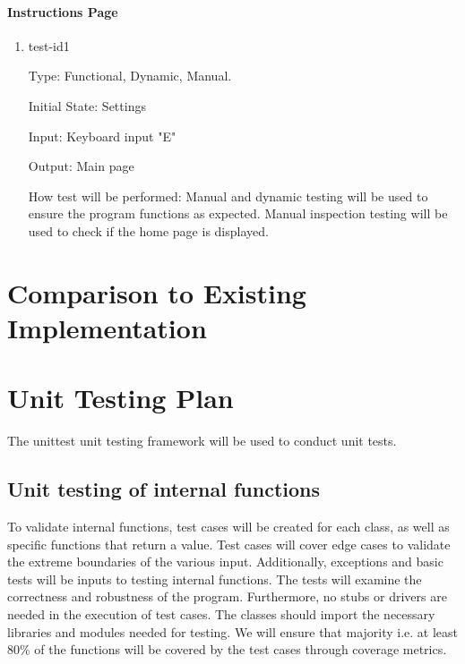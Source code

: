 \documentclass[12pt, titlepage]{article}
\begin{document}
\paragraph{Instructions Page}

\begin{enumerate}
	
	\item{test-id1\\}
	
	Type: Functional, Dynamic, Manual.
	
	Initial State: Settings 
	
	Input: Keyboard input "E"
	
	Output: Main page
	
	How test will be performed: Manual and dynamic testing will be used to ensure the program functions as expected. Manual inspection testing will be used to check if the home page is displayed. 
	
\end{enumerate}

	
\section{Comparison to Existing Implementation}	
				
\section{Unit Testing Plan}


The unittest unit testing framework will be used to conduct unit tests.
		
\subsection{Unit testing of internal functions}

	
To validate internal functions, test cases will be created for each class, as well as specific functions that return a value. Test cases will cover edge cases to validate the extreme boundaries of the various input. Additionally, exceptions and basic tests will be inputs to testing internal functions. The tests will examine the correctness and robustness of the program.  Furthermore, no stubs or drivers are needed in the execution of test cases. The classes should import the necessary libraries and modules needed for testing. We will ensure that majority {i.e. at least 80\%} of the functions will be covered by the test cases through coverage metrics. 
\end{document}
